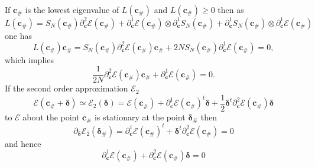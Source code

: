 \documentclass[aps,preprint]{revtex4}%
\begin{document}
If $\mathbf{c}_{\#}$ is the lowest eigenvalue of $L\left(  \mathbf{c}%
_{\#}\right)  $ and $L\left(  \mathbf{c}_{\#}\right)  \geq0$ then as
\begin{equation}
L\left(  \mathbf{c}_{\#}\right)  =S_{N}\left(  \mathbf{c}_{\#}\right)
\partial_{\mathbf{c}}^{2}\mathcal{E}\left(  \mathbf{c}_{\#}\right)
+\partial_{\mathbf{c}}^{1}\mathcal{E}\left(  \mathbf{c}_{\#}\right)
\otimes\partial_{\mathbf{c}}^{1}S_{N}\left(  \mathbf{c}_{\#}\right)
+\partial_{\mathbf{c}}^{1}S_{N}\left(  \mathbf{c}_{\#}\right)  \otimes
\partial_{\mathbf{c}}^{1}\mathcal{E}\left(  \mathbf{c}_{\#}\right)
\end{equation}
one has
\begin{equation}
L\left(  \mathbf{c}_{\#}\right)  \mathbf{c}_{\#}=S_{N}\left(  \mathbf{c}%
_{\#}\right)  \partial_{\mathbf{c}}^{2}\mathcal{E}\left(  \mathbf{c}%
_{\#}\right)  \mathbf{c}_{\#}+2NS_{N}\left(  \mathbf{c}_{\#}\right)
\partial_{\mathbf{c}}^{1}\mathcal{E}\left(  \mathbf{c}_{\#}\right)  =0,
\end{equation}
which implies
\begin{equation}
\frac{1}{2N}\partial_{\mathbf{c}}^{2}\mathcal{E}\left(  \mathbf{c}%
_{\#}\right)  \mathbf{c}_{\#}+\partial_{\mathbf{c}}^{1}\mathcal{E}\left(
\mathbf{c}_{\#}\right)  =0.\label{stat1}%
\end{equation}
If the second order approximation $\mathcal{E}_{2}$
\begin{equation}
\mathcal{E}\left(  \mathbf{c}_{\#}+\mathbf{\delta}\right)  \simeq
\mathcal{E}_{2}\left(  \mathbf{\delta}\right)  =\mathcal{E}\left(
\mathbf{c}_{\#}\right)  +\partial_{\mathbf{c}}^{1}\mathcal{E}\left(
\mathbf{c}_{\#}\right)  ^{t}\mathbf{\delta+}\frac{1}{2}\mathbf{\delta}%
^{t}\partial_{\mathbf{c}}^{2}\mathcal{E}\left(  \mathbf{c}_{\#}\right)
\mathbf{\delta}%
\end{equation}
to $\mathcal{E}$ about the point $\mathbf{c}_{\#}$ is stationary at the point
$\mathbf{\delta}_{\#}$ then
\begin{equation}
\partial_{\mathbf{\delta}}\mathcal{E}_{2}\left(  \mathbf{\delta}_{\#}\right)
=\partial_{\mathbf{c}}^{1}\mathcal{E}\left(  \mathbf{c}_{\#}\right)
^{t}+\mathbf{\delta}^{t}\partial_{\mathbf{c}}^{2}\mathcal{E}\left(
\mathbf{c}_{\#}\right)  =0
\end{equation}
and hence
\begin{equation}
\partial_{\mathbf{c}}^{1}\mathcal{E}\left(  \mathbf{c}_{\#}\right)
+\partial_{\mathbf{c}}^{2}\mathcal{E}\left(  \mathbf{c}_{\#}\right)
\mathbf{\delta}=0\label{stat2}%
\end{equation}
\end{document}
